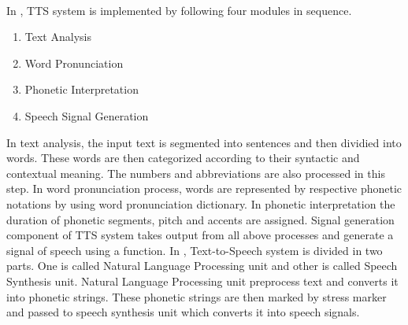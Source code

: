 \\
In \cite{liberman1992text}, TTS system is implemented by following four modules in
sequence.

\begin{enumerate}
  \item Text Analysis
  \item Word Pronunciation
  \item Phonetic Interpretation
  \item Speech Signal Generation
\end{enumerate}

In text analysis, the input text is segmented into sentences and then dividied into words.
These words are then categorized according to their syntactic and contextual meaning. The
numbers and abbreviations are also processed in this step. In word pronunciation process, words
are represented by respective phonetic notations by using word pronunciation dictionary. In
phonetic interpretation the duration of phonetic segments, pitch and accents are assigned. Signal
generation component of TTS system takes output from all above processes and generate a signal
of speech using a function. In \cite{urdu_text_preprocessing}, Text-to-Speech system is divided in
two parts. One is called Natural Language Processing unit and other is called Speech Synthesis
unit. Natural Language Processing unit preprocess text and converts it into phonetic strings. These
phonetic strings are then marked by stress marker and passed to speech synthesis unit which
converts it into speech signals.